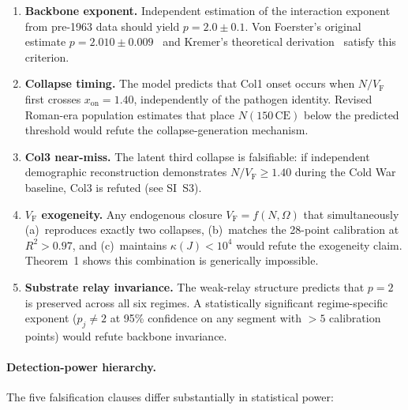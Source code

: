 \documentclass[11pt]{article}
\newcommand{\VF}{V_{\mathrm{F}}}
\begin{document}
\begin{enumerate}[label=(F\arabic*)]
\item \textbf{Backbone exponent.}
Independent estimation of the interaction exponent from pre-1963 data should
yield $p=2.0\pm 0.1$. Von Foerster's original estimate
$p=2.010\pm 0.009$~\cite{vonfoerster1960} and Kremer's theoretical
derivation~\cite{kremer1993} satisfy this criterion.

\item \textbf{Collapse timing.}
The model predicts that Col1 onset occurs when $N/\VF$ first crosses
$x_{\mathrm{on}}=1.40$, independently of the pathogen identity. Revised
Roman-era population estimates that place $N(150\,\mathrm{CE})$ below the
predicted threshold would refute the collapse-generation mechanism.

\item \textbf{Col3 near-miss.}
The latent third collapse is falsifiable: if independent demographic
reconstruction demonstrates $N/\VF\ge 1.40$ during the Cold War baseline,
Col3 is refuted (see SI~S3).

\item \textbf{$\VF$ exogeneity.}
Any endogenous closure $\VF=f(N,\Omega)$ that simultaneously
(a)~reproduces exactly two collapses, (b)~matches the 28-point calibration
at $R^2>0.97$, and (c)~maintains $\kappa(J)<10^4$ would refute the
exogeneity claim. Theorem~1 shows this combination is generically impossible.

\item \textbf{Substrate relay invariance.}
The weak-relay structure predicts that $p=2$ is preserved across all six
regimes. A statistically significant regime-specific exponent
($p_j\neq 2$ at 95\% confidence on any segment with ${>}5$ calibration points)
would refute backbone invariance.
\end{enumerate}

\paragraph{Detection-power hierarchy.}
The five falsification clauses differ substantially in statistical power:
\end{document}
